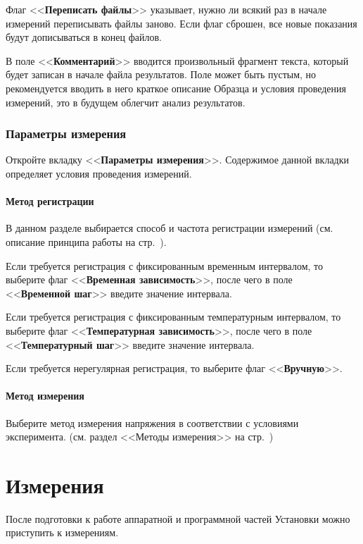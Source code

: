 \documentclass[12pt, a4paper, twocolumn]{report}
\newcommand{\CTL}[1]{<<{\bf #1}>>}
\begin{document}
Флаг \CTL{Переписать файлы} указывает, нужно ли всякий раз в начале измерений переписывать файлы заново. Если флаг сброшен, все новые показания будут дописываться в конец файлов.

В поле \CTL{Комментарий}\label{sec_dut_comment} вводится произвольный фрагмент текста, который будет записан в начале файла результатов. Поле может быть пустым, но рекомендуется вводить в него краткое описание Образца и условия проведения измерений, это в будущем облегчит анализ результатов.

\subsection{Параметры измерения}

Откройте вкладку \CTL{Параметры измерения}. Содержимое данной вкладки определяет условия проведения измерений.

\subsubsection{Метод регистрации}
\label{sec_reg_method}

В данном разделе выбирается способ и частота регистрации измерений (см. описание принципа работы на стр.~\pageref{sec_registration_types}).

Если требуется регистрация с фиксированным временным интервалом, то выберите флаг \CTL{Временная зависимость}, после чего в поле \CTL{Временной шаг} введите значение интервала.

Если требуется регистрация с фиксированным температурным интервалом, то выберите флаг \CTL{Температурная зависимость}, после чего в поле \CTL{Температурный шаг} введите значение интервала.

Если требуется нерегулярная регистрация, то выберите флаг \CTL{Вручную}.

\subsubsection{Метод измерения}

Выберите метод измерения напряжения в соответствии с условиями эксперимента. (см. раздел <<Методы измерения>> на стр.~\pageref{sec_measurement_method})

\chapter{Измерения}

После подготовки к работе аппаратной и программной частей Установки можно приступить к измерениям.
\end{document}
